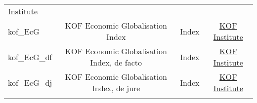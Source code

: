 \documentclass[]{article}
\begin{document}
\begin{longtable}[]{@{}lccc@{}}
\begin{minipage}[t]{0.15\columnwidth}
{Institute}\strut
\end{minipage}\tabularnewline
\begin{minipage}[t]{0.14\columnwidth}\raggedright\strut
kof\_EcG\strut
\end{minipage} & \begin{minipage}[t]{0.36\columnwidth}\centering\strut
KOF Economic Globalisation Index\strut
\end{minipage} & \begin{minipage}[t]{0.24\columnwidth}\centering\strut
Index\strut
\end{minipage} & \begin{minipage}[t]{0.15\columnwidth}\centering\strut
\href{https://www.kof.ethz.ch/en/forecasts-and-indicators/indicators/kof-globalisation-index.html}{KOF
Institute}\strut
\end{minipage}\tabularnewline
\begin{minipage}[t]{0.14\columnwidth}\raggedright\strut
kof\_EcG\_df\strut
\end{minipage} & \begin{minipage}[t]{0.36\columnwidth}\centering\strut
KOF Economic Globalisation Index, de facto\strut
\end{minipage} & \begin{minipage}[t]{0.24\columnwidth}\centering\strut
Index\strut
\end{minipage} & \begin{minipage}[t]{0.15\columnwidth}\centering\strut
\href{https://www.kof.ethz.ch/en/forecasts-and-indicators/indicators/kof-globalisation-index.html}{KOF
Institute}\strut
\end{minipage}\tabularnewline
\begin{minipage}[t]{0.14\columnwidth}\raggedright\strut
kof\_EcG\_dj\strut
\end{minipage} & \begin{minipage}[t]{0.36\columnwidth}\centering\strut
KOF Economic Globalisation Index, de jure\strut
\end{minipage} & \begin{minipage}[t]{0.24\columnwidth}\centering\strut
Index\strut
\end{minipage} & \begin{minipage}[t]{0.15\columnwidth}\centering\strut
\href{https://www.kof.ethz.ch/en/forecasts-and-indicators/indicators/kof-globalisation-index.html}{KOF
Institute}\strut
\end{minipage}\tabularnewline
\begin{minipage}[t]{0.14\columnwidth}\raggedright\strut

\end{minipage}
\end{longtable}
\end{document}
